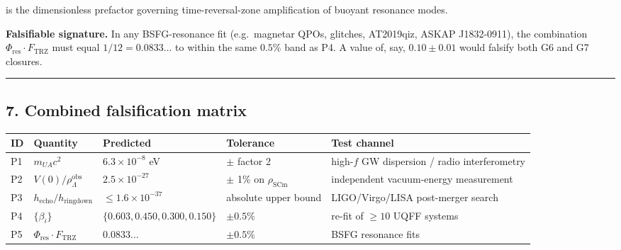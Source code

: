 \documentclass[
]{article}
\newcounter{none} %
\begin{document}
is the dimensionless prefactor governing time-reversal-zone
amplification of buoyant resonance modes.

\textbf{Falsifiable signature.} In any BSFG-resonance fit (e.g.~magnetar
QPOs, glitches, AT2019qiz, ASKAP J1832-0911), the combination
\(\Phi_{\text{res}}\cdot F_{\text{TRZ}}\) must equal
\(1/12 = 0.0833\ldots\) to within the same \(0.5\%\) band as P4. A value
of, say, \(0.10\pm 0.01\) would falsify both G6 and G7 closures.

\begin{center}\rule{0.5\linewidth}{0.5pt}\end{center}

\subsection{7. Combined falsification
matrix}\label{combined-falsification-matrix}

{\def\LTcaptype{none} %
\begin{longtable}[]{@{}
  >{\raggedright\arraybackslash}p{}
  >{\raggedright\arraybackslash}p{}
  >{\raggedright\arraybackslash}p{}
  >{\raggedright\arraybackslash}p{}
  >{\raggedright\arraybackslash}p{}@{}}
\toprule\noalign{}
\begin{minipage}[b]{\linewidth}\raggedright
ID
\end{minipage} & \begin{minipage}[b]{\linewidth}\raggedright
Quantity
\end{minipage} & \begin{minipage}[b]{\linewidth}\raggedright
Predicted
\end{minipage} & \begin{minipage}[b]{\linewidth}\raggedright
Tolerance
\end{minipage} & \begin{minipage}[b]{\linewidth}\raggedright
Test channel
\end{minipage} \\
\midrule\noalign{}
\endhead
\bottomrule\noalign{}
\endlastfoot
P1 & \(m_{UA}c^{2}\) & \(6.3\times10^{-8}\) eV & \(\pm\) factor 2 &
high-\(f\) GW dispersion / radio interferometry \\
P2 & \(V(0)/\rho_{\Lambda}^{\text{obs}}\) & \(2.5\times10^{-27}\) &
\(\pm\) 1\% on \(\rho_{\mathrm{SCm}}\) & independent vacuum-energy
measurement \\
P3 & \(h_{\text{echo}}/h_{\text{ringdown}}\) &
\(\leq 1.6\times10^{-37}\) & absolute upper bound & LIGO/Virgo/LISA
post-merger search \\
P4 & \(\{\beta_{i}\}\) & \(\{0.603, 0.450, 0.300, 0.150\}\) &
\(\pm 0.5\%\) & re-fit of \(\geq 10\) UQFF systems \\
P5 & \(\Phi_{\text{res}}\cdot F_{\text{TRZ}}\) & \(0.0833\ldots\) &
\(\pm 0.5\%\) & BSFG resonance fits \\
\end{longtable}
}
\end{document}
